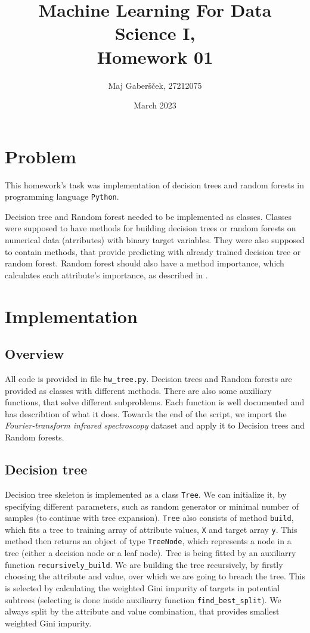 \documentclass{article}
\title{Machine Learning For Data Science I, \\[0.1cm] Homework 01}
\author{Maj Gaberšček, 27212075}
\date{March 2023}
\begin{document}
\maketitle

\section{Problem}

This homework's task was implementation of decision trees and random forests in programming language \texttt{Python}.

Decision tree and Random forest needed to be implemented as classes. Classes were supposed to have methods for building decision trees or random forests on numerical data (atrributes) with binary target variables. They were also supposed to contain methods, that provide predicting with already trained decision tree or random forest. Random forest should also have a method importance, which calculates each attribute's importance, as described in \cite{rand_for}.

\section{Implementation}

\subsection{Overview}

All code is provided in file \texttt{hw\_tree.py}. Decision trees and Random forests are provided as classes with different methods. There are also some auxiliary functions, that solve different subproblems. Each function is well documented and has describtion of what it does. Towards the end of the script, we import the \emph{Fourier-transform infrared spectroscopy} dataset and apply it to Decision trees and Random forests. 

\subsection{Decision tree}

Decision tree skeleton is implemented as a class \texttt{Tree}. We can initialize it, by specifying different parameters, such as random generator or minimal number of samples (to continue with tree expansion). \texttt{Tree} also consists of method \texttt{build}, which fits a tree to training array of attribute values, \texttt{X} and target array \texttt{y}. This method then returns an object of type \texttt{TreeNode}, which represents a node in a tree (either a decision node or a leaf node). Tree is being fitted by an auxiliarry function \texttt{recursively\_build}. We are building the tree recursively, by firstly choosing the attribute and value, over which we are going to breach the tree. This is selected by calculating the weighted Gini impurity of targets in potential subtrees (selecting is done inside auxiliarry function \texttt{find\_best\_split}). We always split by the attribute and value combination, that provides smallest weighted Gini impurity.
\end{document}

